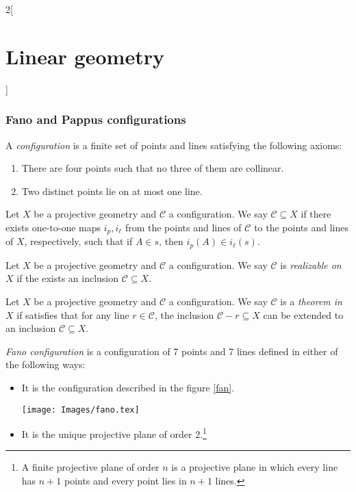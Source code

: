 \documentclass[class=article,10pt,crop=false]{standalone}
\begin{document}
\begin{multicols}{2}[\section{Linear geometry}]
\subsubsection*{Fano and Pappus configurations}
\begin{definition}
A \textit{configuration} is a finite set of points and lines satisfying the following axioms:
\begin{enumerate}
    \item There are four points such that no three of them are collinear.
    \item Two distinct points lie on at most one line.
\end{enumerate}
\end{definition}
\begin{definition}
Let $X$ be a projective geometry and $\mathcal{C}$ a configuration. We say $\mathcal{C}\subseteq X$ if there exists one-to-one maps $i_p,i_\ell$ from the points and lines of $\mathcal{C}$ to the points and lines of $X$, respectively, such that if $A\in s$, then $i_p(A)\in i_\ell(s)$.
\end{definition}
\begin{definition}
Let $X$ be a projective geometry and $\mathcal{C}$ a configuration. We say $\mathcal{C}$ is \textit{realizable on $X$} if the exists an inclusion $\mathcal{C}\subseteq X$.
\end{definition}
\begin{definition}
Let $X$ be a projective geometry and $\mathcal{C}$ a configuration. We say $\mathcal{C}$ is a \textit{theorem in $X$} if satisfies that for any line $r\in\mathcal{C}$, the inclusion $\mathcal{C}-r\subseteq X$ can be extended to an inclusion $\mathcal{C}\subseteq X$.
\end{definition}
\begin{definition}
\textit{Fano configuration} is a configuration of 7 points and 7 lines defined in either of the following ways:
\begin{itemize}
    \item It is the configuration described in the figure \ref{fan}.\par
    \begin{minipage}{\linewidth}
        \centering
        \texttt{[image: Images/fano.tex]} 
        \label{fan}
    \end{minipage}
    \item It is the unique projective plane of order 2.\footnote{A finite projective plane of order $n$ is a  projective plane in which every line has $n+1$ points and every point lies in $n+1$ lines.}

\end{itemize}
\end{definition}
\end{multicols}
\end{document}
